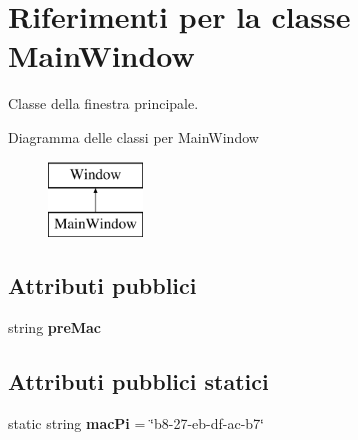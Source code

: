 \hypertarget{class_main_window}{}\section{Riferimenti per la classe Main\+Window}
\label{class_main_window}


Classe della finestra principale.  


Diagramma delle classi per Main\+Window\begin{figure}[H]
\begin{center}
\leavevmode
\includegraphics[height=2.000000cm]{class_main_window}
\end{center}
\end{figure}
\subsection*{Attributi pubblici}
\begin{DoxyCompactItemize}
\item 
\mbox{\label{class_main_window_ad3d94f8786e9b4eb2b6b95ee741ee8d0}} 
string {\bfseries pre\+Mac}
\end{DoxyCompactItemize}
\subsection*{Attributi pubblici statici}
\begin{DoxyCompactItemize}
\item 
\mbox{\label{class_main_window_ae4beb6855fef9be9edb1e94153fa827a}} 
static string {\bfseries mac\+Pi} = \char`\"{}b8-\/27-\/eb-\/df-\/ac-\/b7\char`\"{}
\end{DoxyCompactItemize}
